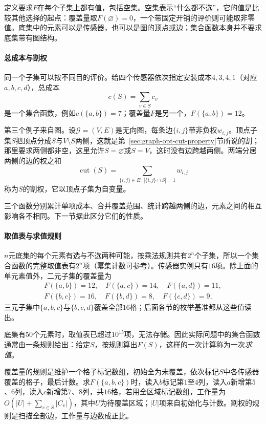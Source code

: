 定义要求$F$在每个子集上都有值，包括空集。空集表示“什么都不选”，它的值是比较其他选择的起点：覆盖量取$F(\varnothing)=0$，一个带固定开销的评价则可能取非零值。底集中的元素可以是传感器，也可以是图的顶点或边；集合函数本身并不要求底集带有图结构。

\paragraph{总成本与割权}
同一个子集可以按不同目的评价。给四个传感器依次指定安装成本$4,3,4,1$（对应$a,b,c,d$），总成本
\[
  c(S)=\sum_{v\in S}c_v
\]
是一个集合函数，例如$c(\{a,b\})=7$；覆盖量$F$是另一个，$F(\{a,b\})=12$。

第三个例子来自图。设$\mathcal G=(V,E)$是无向图，每条边$\{i,j\}$带非负权$w_{i,j}$。顶点子集$S$把顶点分成$S$与$V\setminus S$两侧，这就是第~\ref{sec:graph-opt-cut-property}节所说的割；那里要求两侧都非空，这里允许$S=\varnothing$或$S=V$，这时没有边跨越两侧。两端分居两侧的边的权之和
\[
  \operatorname{cut}(S)=\sum_{\{i,j\}\in E:\ |\{i,j\}\cap S|=1}w_{i,j}
\]
称为$S$的割权，它以顶点子集为自变量。

三个函数分别累计单项成本、合并覆盖范围、统计跨越两侧的边，元素之间的相互影响各不相同。下一节据此区分它们的性质。

\paragraph{取值表与求值规则}
$n$元底集的每个元素有选与不选两种可能，按乘法规则共有$2^n$个子集，所以一个集合函数的完整取值表有$2^n$项（幂集计数可参考）。传感器实例只有$16$项。除上面的单元素值外，二元子集的覆盖量为
\[
  \begin{gathered}
  F(\{a,b\})=12,\quad F(\{a,c\})=14,\quad F(\{a,d\})=11,\\
  F(\{b,c\})=16,\quad F(\{b,d\})=8,\quad F(\{c,d\})=9,
  \end{gathered}
\]
三元子集中$\{a,b,c\}$与$\{b,c,d\}$覆盖全部$16$格；后面各节的枚举基准都从这些值读出。

底集有$50$个元素时，取值表已超过$10^{15}$项，无法存储。因此实际问题中的集合函数通常由一条规则给出：给定$S$，按规则算出$F(S)$，这样的一次计算称为一次\emph{求值}。

覆盖量的规则是维护一个格子标记数组，初始全为未覆盖，依次标记$S$中各传感器覆盖的格子，最后计数。求$F(\{a,b,c\})$时，读入$b$标记第$1$至$4$列，读入$a$新增第$5$、$6$列，读入$c$新增第$7$、$8$列，共$16$格，若用全区域标记数组，工作量为$O(|U|+\sum_{v\in S}|C_v|)$，其中$U$为待覆盖区域；$|U|$项来自初始化与计数。割权的规则是扫描全部边，工作量与边数成正比。


